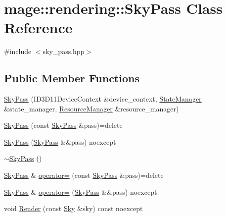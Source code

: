 \hypertarget{classmage_1_1rendering_1_1_sky_pass}{}\section{mage\+:\+:rendering\+:\+:Sky\+Pass Class Reference}
\label{classmage_1_1rendering_1_1_sky_pass}


{\ttfamily \#include $<$sky\+\_\+pass.\+hpp$>$}

\subsection*{Public Member Functions}
\begin{DoxyCompactItemize}
\item 
\hyperlink{classmage_1_1rendering_1_1_sky_pass_a55e8ef167a1e70a88a4be1fd11aed70e}{Sky\+Pass} (I\+D3\+D11\+Device\+Context \&device\+\_\+context, \hyperlink{classmage_1_1rendering_1_1_state_manager}{State\+Manager} \&state\+\_\+manager, \hyperlink{classmage_1_1rendering_1_1_resource_manager}{Resource\+Manager} \&resource\+\_\+manager)
\item 
\hyperlink{classmage_1_1rendering_1_1_sky_pass_a684fba31f92c43b717029d929303db2e}{Sky\+Pass} (const \hyperlink{classmage_1_1rendering_1_1_sky_pass}{Sky\+Pass} \&pass)=delete
\item 
\hyperlink{classmage_1_1rendering_1_1_sky_pass_a2d9489936058c463743bd437fb0cbb3e}{Sky\+Pass} (\hyperlink{classmage_1_1rendering_1_1_sky_pass}{Sky\+Pass} \&\&pass) noexcept
\item 
\hyperlink{classmage_1_1rendering_1_1_sky_pass_a99473ca11c0c25ab0608a3f93cf30aa6}{$\sim$\+Sky\+Pass} ()
\item 
\hyperlink{classmage_1_1rendering_1_1_sky_pass}{Sky\+Pass} \& \hyperlink{classmage_1_1rendering_1_1_sky_pass_a8364836c5db0dc3e9894e1749ab302e8}{operator=} (const \hyperlink{classmage_1_1rendering_1_1_sky_pass}{Sky\+Pass} \&pass)=delete
\item 
\hyperlink{classmage_1_1rendering_1_1_sky_pass}{Sky\+Pass} \& \hyperlink{classmage_1_1rendering_1_1_sky_pass_ad844a754a13fa90ef87aa62745ea936d}{operator=} (\hyperlink{classmage_1_1rendering_1_1_sky_pass}{Sky\+Pass} \&\&pass) noexcept
\item 
void \hyperlink{classmage_1_1rendering_1_1_sky_pass_af0b6421b1c9a638133d6dfe681b1aa78}{Render} (const \hyperlink{classmage_1_1rendering_1_1_sky}{Sky} \&sky) const noexcept
\end{DoxyCompactItemize}
